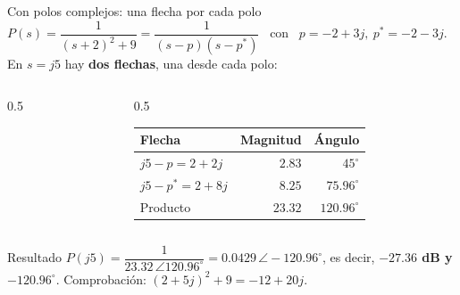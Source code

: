 \documentclass[aspectratio=169,11pt]{beamer}
\newcommand{\ang}[1]{\angle #1^\circ}
\begin{document}
\begin{frame}{Con polos complejos: una flecha por cada polo}
  \footnotesize
  \setlength{\parskip}{1pt}
  $P(s)=\dfrac{1}{(s+2)^2+9}=\dfrac{1}{(s-p)(s-p^*)}$ \ con \ $p=-2+3j,\ p^*=-2-3j$. En $s=j5$ hay \textbf{dos flechas}, una desde cada polo:

  \begin{columns}[T]
    \begin{column}{0.5\textwidth}
      \centering
    \end{column}
    \begin{column}{0.5\textwidth}
      \renewcommand{\arraystretch}{1.25}
      \begin{tabular}{lrr}
        \hline
        \textbf{Flecha} & \textbf{Magnitud} & \textbf{Ángulo} \\
        \hline
        \textcolor{blue!70!black}{$j5-p=2+2j$} & $2.83$ & $45^\circ$ \\
        \textcolor{orange!85!black}{$j5-p^*=2+8j$} & $8.25$ & $75.96^\circ$ \\
        \hline
        Producto & $23.32$ & $120.96^\circ$ \\
        \hline
      \end{tabular}
    \end{column}
  \end{columns}

  \begin{block}{Resultado}
    $P(j5)=\dfrac{1}{23.32\,\ang{120.96}}=0.0429\,\ang{-120.96}$, es decir, \textbf{$-27.36$ dB y $-120.96^\circ$}. Comprobación: $(2+5j)^2+9=-12+20j$.
  \end{block}
\end{frame}
\end{document}
